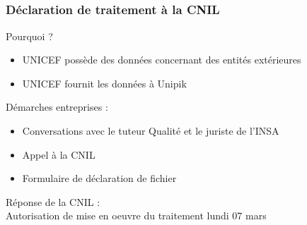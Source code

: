 \subsection{} 

\begin{frame}
\frametitle{Déclaration de traitement à la CNIL}
	Pourquoi ?
	\begin{itemize}
		\item UNICEF possède des données concernant des entités extérieures
		\item UNICEF fournit les données à Unipik
	\end{itemize}
	
	Démarches entreprises :
	\begin{itemize}
		\item Conversations avec le tuteur Qualité et le juriste de l'INSA
		\item Appel à la CNIL
		\item Formulaire de déclaration de fichier 
	\end{itemize}
	
	Réponse de la CNIL :\\
	Autorisation de mise en oeuvre du traitement lundi 07 mars
\end{frame}